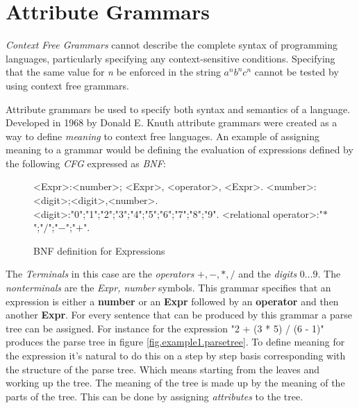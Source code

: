 
\chapter{Attribute Grammars}
\emph{Context Free Grammars} cannot describe the complete syntax of programming languages\cite{knuth1}, particularly specifying any context-sensitive conditions. Specifying that the same value for \emph{n} be enforced in the string $a^nb^nc^n$ cannot be tested by using context free grammars\cite{ken}.

Attribute grammars be used to specify both syntax and semantics of a language. Developed in 1968 by Donald E. Knuth attribute grammars were created as a way to define \emph{meaning} to context free languages. An example of assigning meaning to a grammar would be defining the evaluation of expressions defined by the following \emph{CFG} expressed as \emph{BNF}:

\begin{figure}[H]
\begin{grammar}
<Expr>:<number>; <Expr>, <operator>, <Expr>.
<number>:<digit>;<digit>,<number>.
<digit>:"0";"1";"2";"3";"4";"5";"6";"7";"8";"9".
<relational operator>:"$*$";"$/$";"$-$";"$+$".
\end{grammar}
\caption{BNF definition for Expressions}
\label{grammar:bnf:expr}
\end{figure}

The \emph{Terminals} in this case are the \emph{operators} $+,-,*,/$ and the \emph{digits} $0\ldots 9$. The \emph{nonterminals} are the \emph{Expr, number} symbols. This grammar specifies that an expression is either a \textbf{number} or an \textbf{Expr} followed by an \textbf{operator} and then another \textbf{Expr}. For every sentence that can be produced by this grammar a parse tree can be assigned. For instance for the expression "2 + (3 * 5) / (6 - 1)" produces the parse tree in figure \ref{fig.example1.parsetree}. To define meaning for the expression it's natural to do this on a step by step basis corresponding with the structure of the parse tree. Which means starting from the leaves and working up the tree. The meaning of the tree is made up by the meaning of the parts of the tree. This can be done by assigning \emph{attributes} to the tree.

